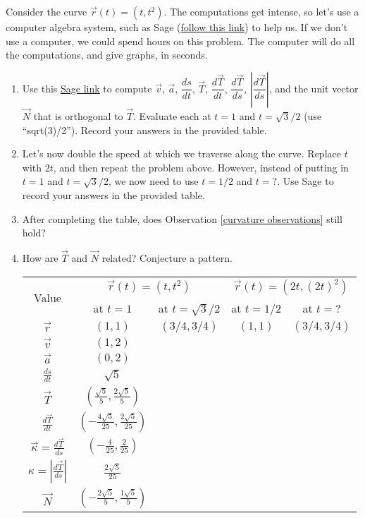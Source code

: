 \begin{problem}
 Consider the curve $\vec r(t) = (t, t^2)$. The computations get intense, so let's use a computer algebra system, such as Sage (\href{\sageurlforcurvature}{follow this link}) to help us. If we don't use a computer, we could spend hours on this problem. The computer will do all the computations, and give graphs, in seconds.
\begin{enumerate}
 \item Use this \href{\sageurlforcurvature}{Sage link} to compute $\vec v$, $\vec a$, $\dfrac{ds}{dt}$, $\vec T$, $\dfrac{d\vec T}{dt}$, $\dfrac{d\vec T}{ds}$, $\left|\dfrac{d\vec T}{ds}\right|$, and the unit vector $\vec N$ that is orthogonal to $\vec T$. Evaluate each at $t=1$ and $t=\sqrt{3}/2$ (use ``sqrt(3)/2''). Record your answers in the provided table.
 \item Let's now double the speed at which we traverse along the curve. Replace $t$ with $2t$, and then repeat the problem above. However, instead of putting in $t=1$ and $t=\sqrt{3}/2$, we now need to use $t=1/2$ and $t=?$. Use Sage to record your answers in the provided table.
 \item After completing the table, does Observation \ref{curvature observations} still hold?
 \item How are $\vec T$ and $\vec N$ related?  Conjecture a pattern.
\begin{center}
 \begin{tabular}{|c|c|c|c|c|}\hline
  \multirow{2}{*}{Value}&\multicolumn{2}{|c|}{$\vec r(t)=(t,t^2)$}&\multicolumn{2}{|c|}{$\vec r(t)=(2t,(2t)^2)$}\\
  &\quad \quad at $t=1$ \quad \quad & \quad at $t=\sqrt3/2$\quad \quad &\quad \quad at $t=1/2$\quad \quad  & \quad at $t=?$\quad\quad\quad \quad \\\hline
  $\vec r$   & $(1,1)$ & $(3/4,3/4)$ & $(1,1)$ & $(3/4,3/4)$ \\\hline
  $\vec v$   & $(1,2)$& & & \\\hline
  $\vec a$   & $(0,2)$& & & \\\hline
  $\frac{ds}{dt} $    &$\sqrt{5}$ & & & \\\hline
  $\vec T$   & $(\frac{\sqrt{5}}{5},\frac{2\sqrt{5}}{5})$ & & & \\\hline
  $\frac{d\vec T}{dt} $    &$(-\frac{4\sqrt{5}}{25},\frac{2\sqrt{5}}{25})$ & & & \\\hline
  $\vec\kappa=\frac{d\vec T}{ds} $   & $(-\frac{4}{25},\frac{2}{25})$& & & \\\hline
  $\kappa=\left|\frac{d\vec T}{ds}\right| $   &$\frac{2\sqrt{5}}{25}$ & & & \\\hline
  $\vec N$   &$(-\frac{2\sqrt{5}}{5},\frac{1\sqrt{5}}{5})$ & & & \\\hline
 \end{tabular}
 
\end{center}
\end{enumerate}
\end{problem}

